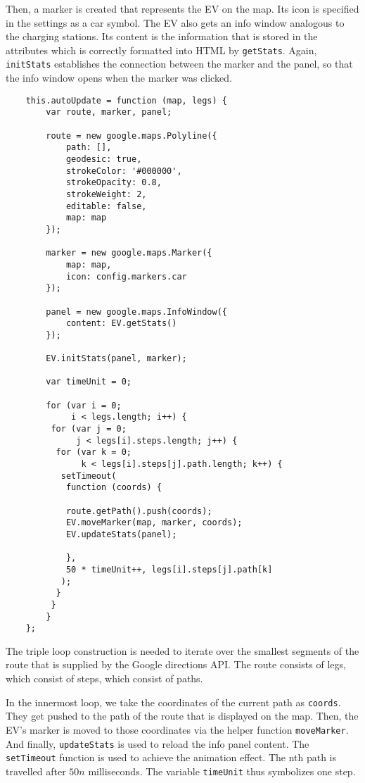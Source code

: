 Then, a marker is created that represents the EV on the map. Its icon is specified in the settings as a car symbol. The EV also gets an info window analogous to the charging stations. Its content is the information that is stored in the attributes which is correctly formatted into HTML by \texttt{getStats}. Again, \texttt{initStats} establishes the connection between the marker and the panel, so that the info window opens when the marker was clicked.

\begin{verbatim}
    this.autoUpdate = function (map, legs) {
        var route, marker, panel;

        route = new google.maps.Polyline({
            path: [],
            geodesic: true,
            strokeColor: '#000000',
            strokeOpacity: 0.8,
            strokeWeight: 2,
            editable: false,
            map: map
        });

        marker = new google.maps.Marker({
            map: map,
            icon: config.markers.car
        });

        panel = new google.maps.InfoWindow({
            content: EV.getStats()
        });

        EV.initStats(panel, marker);

        var timeUnit = 0;

        for (var i = 0;
             i < legs.length; i++) {
         for (var j = 0;
              j < legs[i].steps.length; j++) {
          for (var k = 0;
               k < legs[i].steps[j].path.length; k++) {
           setTimeout(
            function (coords) {

            route.getPath().push(coords);
            EV.moveMarker(map, marker, coords);
            EV.updateStats(panel);

            },
            50 * timeUnit++, legs[i].steps[j].path[k]
           );
          }
         }
        }
    };
\end{verbatim}

The triple loop construction is needed to iterate over the smallest segments of the route that is supplied by the Google directions API. The route consists of legs, which consist of steps, which consist of paths.

In the innermost loop, we take the coordinates of the current path as \texttt{coords}. They get pushed to the path of the route that is displayed on the map. Then, the EV's marker is moved to those coordinates via the helper function \texttt{moveMarker}. And finally, \texttt{updateStats} is used to reload the info panel content. The \texttt{setTimeout} function is used to achieve the animation effect. The nth path is travelled after $50n$ milliseconds. The variable \texttt{timeUnit} thus symbolizes one step.

